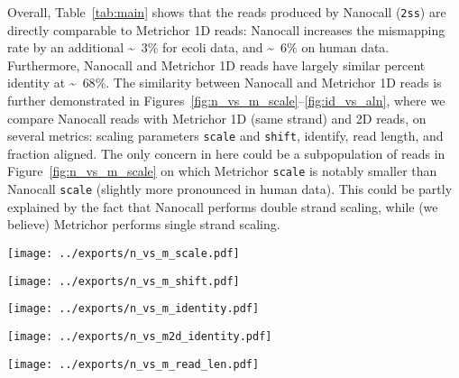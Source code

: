 \documentclass{bioinfo}
\begin{document}
Overall, Table~\ref{tab:main} shows that the reads produced by Nanocall (\texttt{2ss}) are directly comparable to Metrichor 1D reads: Nanocall increases the mismapping rate by an additional \sim~$3\%$ for ecoli data, and \sim~$6\%$ on human data. Furthermore, Nanocall and Metrichor 1D reads have largely similar percent identity at \sim~$68\%$. The similarity between Nanocall and Metrichor 1D reads is further demonstrated in Figures~\ref{fig:n_vs_m_scale}--\ref{fig:id_vs_aln}, where we compare Nanocall reads with Metrichor 1D (same strand) and 2D reads, on several metrics: scaling parameters \texttt{scale} and \texttt{shift}, identify, read length, and fraction aligned. The only concern in here could be a subpopulation of reads in Figure~\ref{fig:n_vs_m_scale} on which Metrichor \texttt{scale} is notably smaller than Nanocall \texttt{scale} (slightly more pronounced in human data). This could be partly explained by the fact that Nanocall performs double strand scaling, while (we believe) Metrichor performs single strand scaling.

\begin{figure*}[!tp]
\centerline{\texttt{[image: ../exports/n\_vs\_m\_scale.pdf]}}
\caption{Nanocall vs Metrichor \texttt{scale}.}\label{fig:n_vs_m_scale}
\end{figure*}

\begin{figure*}[!tp]
\centerline{\texttt{[image: ../exports/n\_vs\_m\_shift.pdf]}}
\caption{Nanocall vs Metrichor \texttt{shift}.}\label{fig:n_vs_m_shift}
\end{figure*}

\begin{figure*}[!tp]
\centerline{\texttt{[image: ../exports/n\_vs\_m\_identity.pdf]}}
\caption{Nanocall vs Metrichor identity.}\label{fig:n_vs_m_identity}
\end{figure*}

\begin{figure*}[!tp]
\centerline{\texttt{[image: ../exports/n\_vs\_m2d\_identity.pdf]}}
\caption{Nanocall vs Metrichor 2D identity.}\label{fig:n_vs_m2d_identity}
\end{figure*}

\begin{figure*}[!tp]
\centerline{\texttt{[image: ../exports/n\_vs\_m\_read\_len.pdf]}}
\caption{Nanocall vs Metrichor read length.}\label{fig:n_vs_m_read_len}
\end{figure*}
\end{document}
